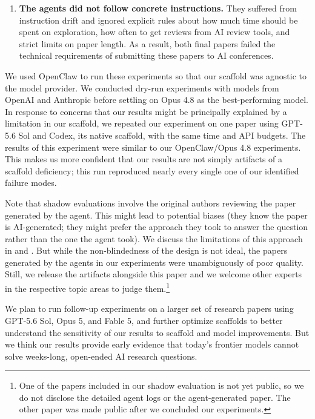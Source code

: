 \documentclass[]{crux} %
\begin{document}
\begin{enumerate}[leftmargin=*,itemsep=5pt]
  \item \textbf{The agents did not follow concrete instructions.} They
  suffered from instruction drift and ignored explicit rules about how much
  time should be spent on exploration, how often to get reviews from AI review
  tools, and strict limits on paper length. As a result, both final papers
  failed the technical requirements of submitting these papers to AI
  conferences.
\end{enumerate}

We used OpenClaw to run these experiments so that our scaffold was agnostic to
the model provider. We conducted dry-run experiments with models from OpenAI
and Anthropic before settling on Opus 4.8 as the best-performing model. In
response to concerns that our results might be principally explained by a
limitation in our scaffold, we repeated our experiment on one paper using
GPT-5.6 Sol and Codex, its native scaffold, with the same time and API budgets.
The results of this experiment were similar to our OpenClaw/Opus 4.8
experiments. This makes us more confident that our results are not simply
artifacts of a scaffold deficiency; this run reproduced nearly every single
one of our identified failure modes.

Note that shadow evaluations involve the original authors reviewing the paper generated by the agent. This might lead to potential biases (they know the paper is AI-generated; they might prefer the approach they took to answer the question rather than the one the agent took). We discuss the limitations of this approach in  and . But while the non-blindedness of the design is not ideal, the papers generated by the agents in our experiments were unambiguously of poor quality. Still, we release the artifacts alongside this paper and we welcome other experts in the respective topic areas to judge them.\footnote{One of the papers included
in our shadow evaluation is not yet public, so we do not disclose the detailed
agent logs or the agent-generated paper. The other paper was made public after
we concluded our experiments.}

We plan to run follow-up experiments on a larger set of research papers using
GPT-5.6 Sol, Opus 5, and Fable 5, and further optimize scaffolds to better
understand the sensitivity of our results to scaffold and model improvements.
But we think our results provide early evidence that today's frontier models
cannot solve weeks-long, open-ended AI research questions.
\end{document}
